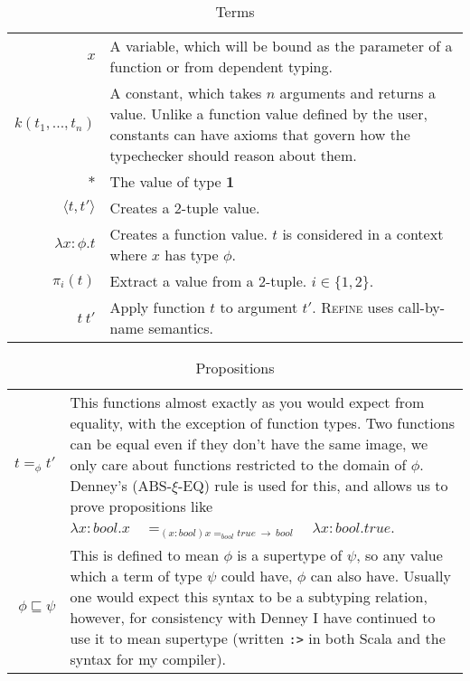 \begin{table}
    \begin{tabular}{|r|p{}|}
        \hline
        $x$ &
        A variable, which will be bound as the parameter of a function or from dependent typing.\\\cline{1-2}
        $k(t_1, ..., t_n)$ &
        A constant, which takes $n$ arguments and returns a value.
        Unlike a function value defined by the user, constants can have axioms that govern how the typechecker
        should reason about them.\\\cline{1-2}
        $\ast$ &
        The value of type \textbf{1}\\\cline{1-2}
        $\langle t, t' \rangle$ &
        Creates a 2-tuple value.\\\cline{1-2}
        $\lambda x: \phi . t$ &
        Creates a function value.
        $t$ is considered in a context where $x$ has type $\phi$.\\\cline{1-2}
        $\pi_i(t)$ &
        Extract a value from a 2-tuple. $i \in \{1, 2\}$.\\\cline{1-2}
        $t\ t'$ &
        Apply function $t$ to argument $t'$.
        \textsc{Refine} uses call-by-name semantics.\\\hline
    \end{tabular}
    \caption{Terms}
    \label{tab:terms}
\end{table}

\begin{table}
    \begin{tabular}{|r|p{}|}
        \hline
        $t =_\phi t'$ &
        This functions almost exactly as you would expect from equality, with the exception of function types.
        Two functions can be equal even if they don't have the same image, we only care about functions
        restricted to the domain of $\phi$.
        Denney's (ABS-$\xi$-EQ) rule is used for this, and allows us to prove propositions like\newline
        $\lambda x: bool . x \quad =_{(x:bool) x =_{bool} true\ \rightarrow\ bool} \quad \lambda x: bool . true$.
        \\\cline{1-2}
        $\phi \sqsubseteq \psi$ &
        This is defined to mean $\phi$ is a supertype of $\psi$,
        so any value which a term of type $\psi$ could have, $\phi$ can also have.
        Usually one would expect this syntax to be a subtyping relation, however, for consistency with
        Denney I have continued to use it to mean supertype (written \texttt{:>} in both Scala and
        the syntax for my compiler).\\\hline
    \end{tabular}
    \caption{Propositions}
    \label{tab:propositions}
\end{table}

